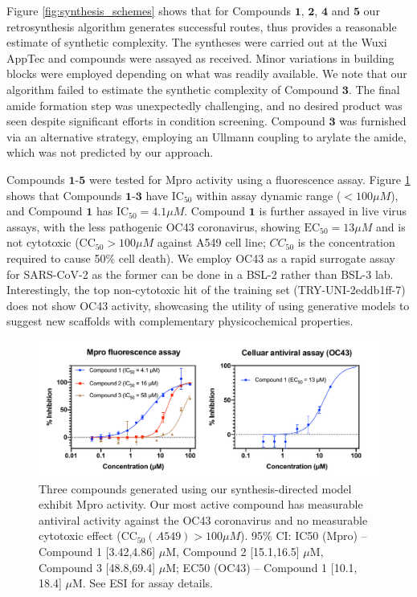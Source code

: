 Figure \ref{fig:synthesis_schemes} shows that for Compounds $\mathbf{1}$, $\mathbf{2}$, $\mathbf{4}$ and $\mathbf{5}$ our retrosynthesis algorithm generates successful routes, thus provides a reasonable estimate of synthetic complexity. The syntheses were carried out at the Wuxi AppTec and compounds were assayed as received. Minor variations in building blocks were employed depending on what was readily available. We note that our algorithm failed to estimate the synthetic complexity of Compound $\mathbf{3}$. The final amide formation step was unexpectedly challenging, and no desired product was seen despite significant efforts in condition screening. Compound $\mathbf{3}$ was furnished via an alternative strategy, employing an Ullmann coupling to arylate the amide, which was not predicted by our approach. 

Compounds $\mathbf{1}$-$\mathbf{5}$ were tested for Mpro activity using a fluorescence assay. Figure \ref{fig:data} shows that Compounds $\mathbf{1}$-$\mathbf{3}$ have $\mathrm{IC}_{50}$ within assay dynamic range ($<100 \mu M$), and Compound $\mathbf{1}$ has $\mathrm{IC}_{50} = 4.1 \mu M$. Compound $\mathbf{1}$ is further assayed in live virus assays, with the less pathogenic OC43 coronavirus, showing $\mathrm{EC}_{50} = 13 \mu M$ and is not cytotoxic ($\mathrm{CC}_{50}>100 \mu M$ against A549 cell line; $CC_{50}$ is the concentration required  to cause 50\% cell death). We employ OC43 as a rapid surrogate assay for SARS-CoV-2 as the former can be done in a BSL-2 rather than BSL-3 lab.  Interestingly, the top non-cytotoxic hit of the training set (TRY-UNI-2eddb1ff-7) does not show OC43 activity, showcasing the utility of using generative models to suggest new scaffolds with complementary physicochemical properties. 

\begin{figure}
    \centering
    \includegraphics[scale=0.36]{Chapters/Ranking/Figs/data_curve.pdf}
    \caption{Three compounds generated using our synthesis-directed model exhibit Mpro activity. Our most active compound has measurable antiviral activity against the OC43 coronavirus and no measurable cytotoxic effect ($\mathrm{CC}_{50} (A549)>100 \mu M$). 95\% CI: IC50 (Mpro) -- Compound 1 [3.42,4.86] $\mu$M, Compound 2 [15.1,16.5] $\mu$M, Compound 3 [48.8,69.4] $\mu$M; EC50 (OC43) -- Compound 1 [10.1, 18.4] $\mu$M. See ESI for assay details.}
    \label{fig:data}
\end{figure}

